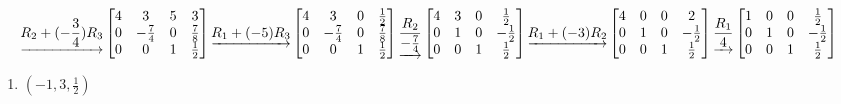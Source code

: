 \documentclass[
  11,
]{article}
\providecommand{\tightlist}{%
  \setlength{\itemsep}{0pt}\setlength{\parskip}{0pt}}
\begin{document}
\[\underrightarrow{ R_2 + (- \frac{3}{4})R_3 }
\left[\begin{matrix}4 & 3 & 5 & 3\\0 & - \frac{7}{4} & 0 & \frac{7}{8}\\0 & 0 & 1 & \frac{1}{2}\end{matrix}\right]
\underrightarrow{ R_1 + (-5)R_3 }
\\
\left[\begin{matrix}4 & 3 & 0 & \frac{1}{2}\\0 & - \frac{7}{4} & 0 & \frac{7}{8}\\0 & 0 & 1 & \frac{1}{2}\end{matrix}\right]
\underrightarrow{ \frac{R_2}{- \frac{7}{4}} }
\left[\begin{matrix}4 & 3 & 0 & \frac{1}{2}\\0 & 1 & 0 & - \frac{1}{2}\\0 & 0 & 1 & \frac{1}{2}\end{matrix}\right]
\underrightarrow{ R_1 + (-3)R_2 }
\\
\left[\begin{matrix}4 & 0 & 0 & 2\\0 & 1 & 0 & - \frac{1}{2}\\0 & 0 & 1 & \frac{1}{2}\end{matrix}\right]
\underrightarrow{ \frac{R_1}{4} }
\left[\begin{matrix}1 & 0 & 0 & \frac{1}{2}\\0 & 1 & 0 & - \frac{1}{2}\\0 & 0 & 1 & \frac{1}{2}\end{matrix}\right]
  \]

\begin{enumerate}
\def\labelenumi{\alph{enumi})}
\setcounter{enumi}{3}
\tightlist
\item
  \((-1,3,\frac{1}{2})\)
\end{enumerate}
\end{document}

